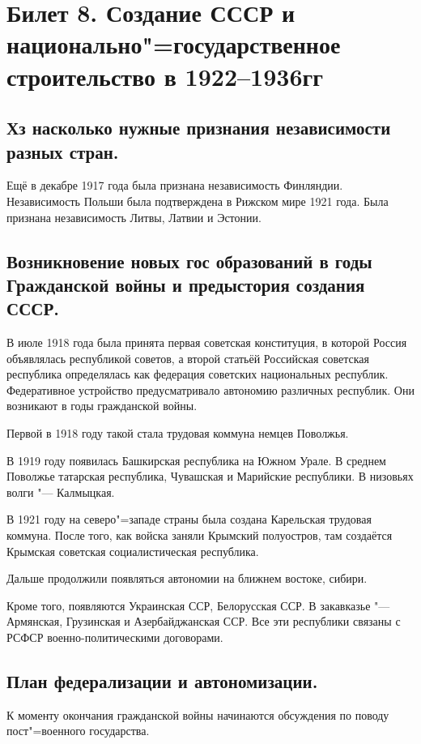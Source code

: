\section{Билет 8. Создание СССР и национально"=государственное строительство в 1922--1936гг}

\subsection{Хз насколько нужные признания независимости разных стран.}

Ещё в декабре 1917 года была признана независимость Финляндии. Независимость Польши была подтверждена в Рижском мире 1921 года. Была признана независимость Литвы, Латвии и Эстонии.

\subsection{Возникновение новых гос образований в годы Гражданской войны и предыстория создания СССР.}

В июле 1918 года была принята первая советская конституция, в которой Россия объявлялась республикой советов, а второй статьёй Российская советская республика определялась как федерация советских национальных республик. Федеративное устройство предусматривало автономию различных республик. Они возникают в годы гражданской войны.

Первой в 1918 году такой стала трудовая коммуна немцев Поволжья.

В 1919 году появилась Башкирская республика на Южном Урале. В среднем Поволжье татарская республика, Чувашская и Марийские республики. В низовьях волги "--- Калмыцкая.

В 1921 году на северо"=западе страны была создана Карельская трудовая коммуна. После того, как войска заняли Крымский полуостров, там создаётся Крымская советская социалистическая республика. 

Дальше продолжили появляться автономии на ближнем востоке, сибири.

Кроме того, появляются Украинская ССР, Белорусская ССР. В закавказье "--- Армянская, Грузинская и Азербайджанская ССР. Все эти республики связаны с РСФСР военно-политическими договорами.

\subsection{План федерализации и автономизации.}

К моменту окончания гражданской войны начинаются обсуждения по поводу пост"=военного государства. 

